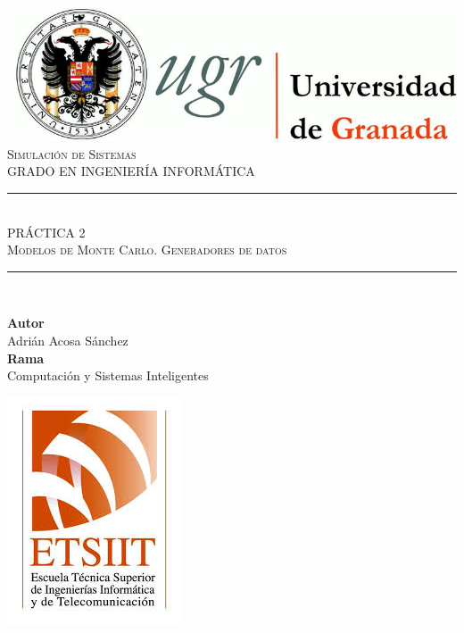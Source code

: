 \documentclass[11pt,a4paper]{report}
\newcommand{\asignatura}{Simulación de Sistemas}
\newcommand{\autor}{Adrián Acosa Sánchez}
\newcommand{\titulo}{PRÁCTICA 2}
\newcommand{\subtitulo}{Modelos de Monte Carlo. Generadores de datos}
\newcommand{\rama}{Computación y Sistemas Inteligentes}
\begin{document}

\begin{titlepage}

\begin{minipage}{\textwidth}

\centering

\includegraphics[scale=0.3]{img/logo_ugr.jpg}\\[1cm]

\textsc{\Large \asignatura{}\\[0.2cm]}
\textsc{GRADO EN INGENIERÍA INFORMÁTICA}\\[1cm]

\noindent\rule[-1ex]{\textwidth}{1pt}\\[1.5ex]
\textsc{{\Huge \titulo\\[0.5ex]}}
\textsc{{\Large \subtitulo\\}}
\noindent\rule[-1ex]{\textwidth}{2pt}\\[3.5ex]

\end{minipage}

\vspace{0.7cm}

\begin{minipage}{\textwidth}

\centering

\textbf{Autor}\\ {\autor{}}\\[2.5ex]
\textbf{Rama}\\ {\rama}\\[2.5ex]
\vspace{0.3cm}

\includegraphics[scale=0.3]{img/etsiit.jpeg}


\end{minipage}
\end{titlepage}
\end{document}
